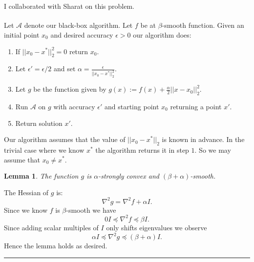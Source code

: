 \documentclass[letterpaper,12pt,oneside,onecolumn]{article}
\newcommand{\cA}{\mathcal{A}} \newcommand{\cB}{\mathcal{B}}
\newenvironment{proof}{{\bf Proof:  }}{\hfill\rule{2mm}{2mm}}
\newtheorem{lemma}[fact]{Lemma}
\begin{document}
\section{}

\section{}

\section{}
\paragraph{}
I collaborated with Sharat on this problem.
\paragraph{}
Let $\cA$ denote our black-box algorithm. Let $f$ be at $\beta$-smooth function. Given an initial point $x_0$ and desired accuracy $\epsilon > 0$ our algorithm does:
\begin{enumerate}
\item If $||x_0 - x^*||_2^2 = 0$ return $x_0$.
\item Let $\epsilon' = \epsilon/2$ and set $\alpha = \frac{\epsilon}{||x_0 - x^*||_2^2}$.
\item Let $g$ be the function given by $g(x) := f(x) + \frac{\alpha}{2}||x - x_0||_2^2$.
\item Run $\cA$ on $g$ with accuracy $\epsilon'$ and starting point $x_0$ returning a point $x'$.
\item Return solution $x'$.
\end{enumerate} 
Our algorithm assumes that the value of $||x_0 - x^*||_2$ is known in advance. In the trivial case where we know $x^*$ the algorithm returns it in step $1$. So we may assume that $x_0 \neq x^*$.
\begin{lemma}\label{lemma:convex-smooth}
The function $g$ is $\alpha$-strongly convex and $(\beta + \alpha)$-smooth.
\end{lemma}
\begin{proof}
The Hessian of $g$ is:
$$\nabla^2 g = \nabla^2 f + \alpha I.$$
Since we know $f$ is $\beta$-smooth we have
$$0I \preccurlyeq \nabla^2 f \preccurlyeq \beta I.$$
Since adding scalar multiples of $I$ only shifts eigenvalues we observe
$$\alpha I \preccurlyeq \nabla^2 g \preccurlyeq (\beta + \alpha) I.$$
Hence the lemma holds as desired. 
\end{proof}
\end{document}
